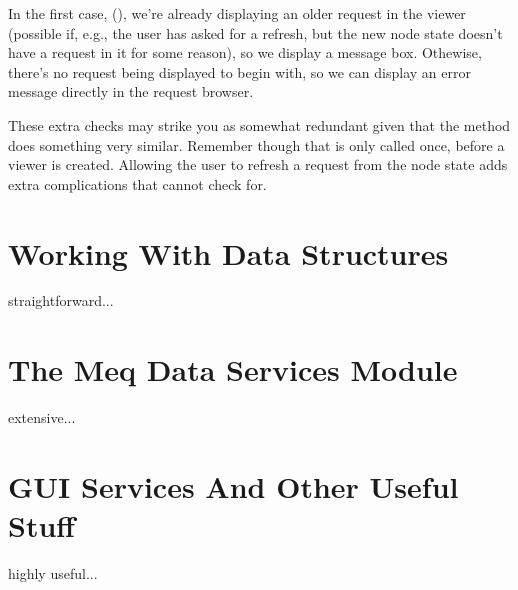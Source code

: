 \documentclass[12pt,twoside]{book}
\begin{document}
  In the first case, (), we're already
  displaying an older request in the viewer (possible if, e.g., the user has
  asked for a refresh, but the new node state doesn't have a request in it for
  some reason), so we display a message box. Othewise, there's no request being
  displayed to begin with, so we can display an error message directly in the
  request browser.

  These extra checks may strike you as somewhat redundant given that the
   method does something very similar. Remember though that
   is only called once, before a viewer is created. Allowing
  the user to refresh a request from the node state adds extra complications
  that  cannot check for.
  
\chapter{Working With Data Structures}

  straightforward...

\chapter{The Meq Data Services Module}  

  extensive...

\chapter{GUI Services And Other Useful Stuff}

  highly useful...
\end{document}
